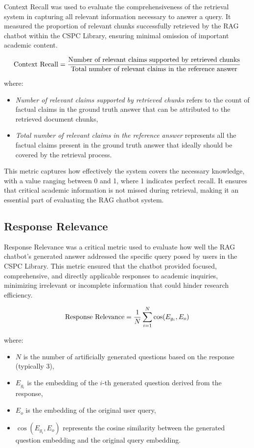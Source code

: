 \begin{refsection}
Context Recall was used to evaluate the comprehensiveness of the retrieval system in capturing all relevant information necessary to answer a query. It measured the proportion of relevant chunks successfully retrieved by the RAG chatbot within the CSPC Library, ensuring minimal omission of important academic content.

\begin{equation}
\centering
\text{Context Recall} = \frac{\text{Number of relevant claims supported by retrieved chunks}}{\text{Total number of relevant claims in the reference answer}}
\end{equation}

where:

\begin{itemize}
    \item \textit{Number of relevant claims supported by retrieved chunks} refers to the count of factual claims in the ground truth answer that can be attributed to the retrieved document chunks,
    \item \textit{Total number of relevant claims in the reference answer} represents all the factual claims present in the ground truth answer that ideally should be covered by the retrieval process.
\end{itemize}

This metric captures how effectively the system covers the necessary knowledge, with a value ranging between 0 and 1, where 1 indicates perfect recall. It ensures that critical academic information is not missed during retrieval, making it an essential part of evaluating the RAG chatbot system.


\subsection*{Response Relevance}

Response Relevance was a critical metric used to evaluate how well the RAG chatbot's generated answer addressed the specific query posed by users in the CSPC Library. This metric ensured that the chatbot provided focused, comprehensive, and directly applicable responses to academic inquiries, minimizing irrelevant or incomplete information that could hinder research efficiency.

\begin{equation}
\centering
\text{Response Relevance} = \frac{1}{N} \sum_{i=1}^{N} \cos(E_{g_i}, E_o)
\end{equation}

where:
\begin{itemize}
    \item $N$ is the number of artificially generated questions based on the response (typically 3),
    \item $E_{g_i}$ is the embedding of the $i$-th generated question derived from the response,
    \item $E_o$ is the embedding of the original user query,
    \item $\cos(E_{g_i}, E_o)$ represents the cosine similarity between the generated question embedding and the original query embedding.
\end{itemize}


\end{refsection}
